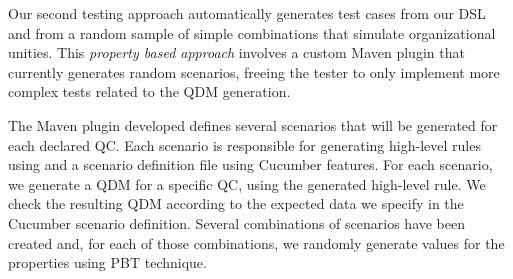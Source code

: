 Our second testing approach automatically generates test cases from our DSL and from a random sample of simple combinations that simulate organizational unities. This \emph{property based approach} involves a custom Maven plugin that currently generates random scenarios, freeing the tester to only implement more complex tests related to the QDM generation. 



The Maven plugin developed defines several scenarios that will be generated for each declared QC. Each scenario is responsible for generating high-level rules using \hlrdsl and a scenario definition file using Cucumber features. For each scenario, we generate a QDM for a specific QC, using the generated high-level rule.
We check the resulting QDM according to the expected data we specify in the Cucumber scenario definition. Several combinations of scenarios have been created and, for each of those combinations, we randomly generate values for the properties using PBT technique.


